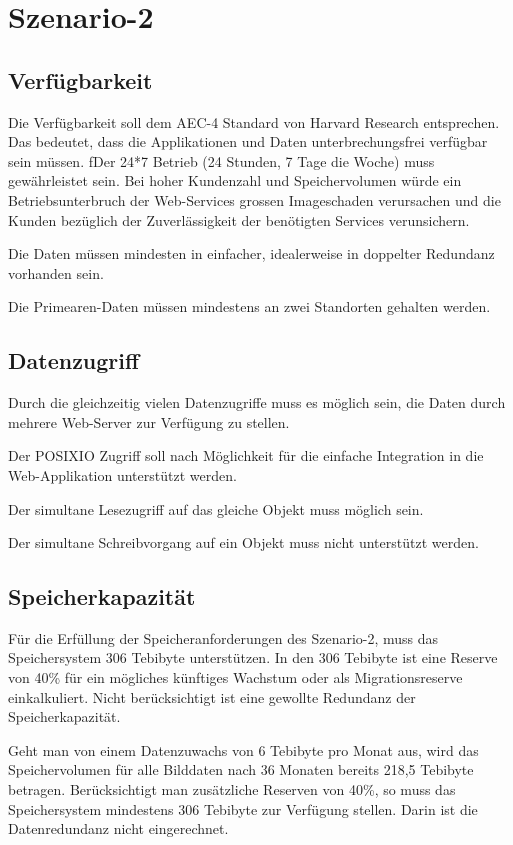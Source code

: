 \section{Szenario-2}

\subsection{Verfügbarkeit}
Die Verfügbarkeit soll dem AEC-4 Standard von Harvard Research entsprechen. Das bedeutet, dass die Applikationen und Daten unterbrechungsfrei verfügbar sein müssen. ƒDer 24*7 Betrieb (24 Stunden, 7 Tage die Woche) muss gewährleistet sein. Bei hoher Kundenzahl und Speichervolumen würde ein Betriebsunterbruch der Web-Services grossen Imageschaden verursachen und die Kunden bezüglich der Zuverlässigkeit der benötigten Services verunsichern.

Die Daten müssen mindesten in einfacher, idealerweise in doppelter Redundanz vorhanden sein. 

Die \gls{Primearen-Daten} müssen mindestens an zwei Standorten gehalten werden.

\subsection{Datenzugriff}
Durch die gleichzeitig vielen Datenzugriffe muss es möglich sein, die Daten durch mehrere Web-Server zur Verfügung zu stellen.

Der \gls{POSIXIO} Zugriff soll nach Möglichkeit für die einfache Integration in die Web-Applikation unterstützt werden.

Der simultane Lesezugriff auf das gleiche Objekt muss möglich sein.

Der simultane Schreibvorgang auf ein Objekt muss nicht unterstützt werden.

\subsection{Speicherkapazität}
Für die Erfüllung der Speicheranforderungen des Szenario-2, muss das Speichersystem 306 Tebibyte unterstützen. In den 306 Tebibyte ist eine Reserve von 40\% für ein mögliches künftiges Wachstum oder als Migrationsreserve einkalkuliert. Nicht berücksichtigt ist eine gewollte Redundanz der Speicherkapazität.

Geht man von einem Datenzuwachs von 6 Tebibyte pro Monat aus, wird das Speichervolumen für alle Bilddaten nach 36 Monaten bereits 218,5 Tebibyte betragen. Berücksichtigt man zusätzliche Reserven von 40\%, so muss das Speichersystem mindestens 306 Tebibyte zur Verfügung stellen. Darin ist die Datenredundanz nicht eingerechnet.

